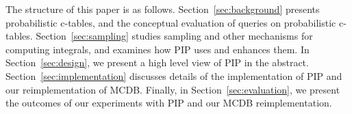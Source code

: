 The structure of this paper is as follows. Section~\ref{sec:background} presents probabilistic c-tables, and the conceptual  evaluation of queries on probabilistic c-tables. Section~\ref{sec:sampling} studies sampling and other mechanisms for computing integrals, and examines how PIP uses and enhances them.  In Section~\ref{sec:design}, we present a high level view of PIP in the abstract.   Section~\ref{sec:implementation} discusses details of the implementation of PIP and our reimplementation of MCDB.  Finally, in Section~\ref{sec:evaluation}, we present the outcomes of our experiments with PIP and our MCDB reimplementation.